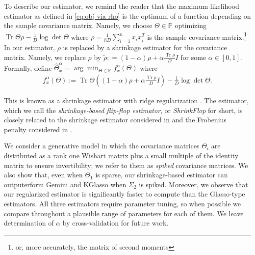 \documentclass[aos]{imsart}
\theoremstyle{definition}
\numberwithin{equation}{section}
\DeclareMathOperator{\tr}{Tr}
\renewcommand{\P}{{\mathbb{P}}}
\newcommand{\samp}{x}
\begin{document}
To describe our estimator, we remind the reader that the maximum likelihood estimator as defined in \cref{eq:obj via rho} is the optimum of a function depending on the sample covariance matrix.
Namely, we choose $\Theta \in \P$ optimizing $\tr \Theta \rho - \frac{1}{D}\log \det \Theta$ where $\rho = \frac{1}{n D} \sum_{i = 1}^n x_i x_i^T$ is the sample covariance matrix.\footnote{or, more accurately, the matrix of second moments}
In our estimator, $\rho$ is replaced by a shrinkage estimator for the covariance matrix.
Namely, we replace $\rho$ by $\tilde{\rho}: = (1- \alpha) \rho + \alpha \frac{\tr \rho}{D} I $ for some $\alpha \in [0,1]$. Formally, define $\widehat{\Theta}^\alpha_x = \arg\min_{\Theta \in \P} f^\alpha_\samp(\Theta)$ where
\begin{align*}
  f_{\samp}^\alpha(\Theta)
  :=  \tr \Theta \left((1 - \alpha) \rho + \alpha \frac{\tr \rho}{D} I\right) - \frac{1}{D}\log\det\Theta.
\end{align*}

This is known as a shrinkage estimator with ridge regularization \citep{warton2008penalized}.
The estimator, which we call the \emph{shrinkage-based flip-flop estimator}, or \emph{ShrinkFlop} for short, is closely related to the shrinkage estimator considered in \cite{goes2020robust} and the Frobenius penalty considered in \cite{tang2018integrated}.

We consider a generative model in which the covariance matrices $\Theta_i$ are distributed as a rank one Wishart matrix plus a small multiple of the identity matrix to ensure invertibility; we refer to them as \emph{spiked} covariance matrices.
We also show that, even when $\Theta_1$ is sparse, our shrinkage-based estimator can outputerform Gemini and KGlasso when $\Sigma_2$ is spiked.
Moreover, we observe that our regularized estimator is significantly faster to compute than the Glasso-type estimators. All three estimators require parameter tuning, so when possible we compare throughout a plausible range of parameters for each of them. We leave determination of $\alpha$ by cross-validation for future work.
\end{document}
